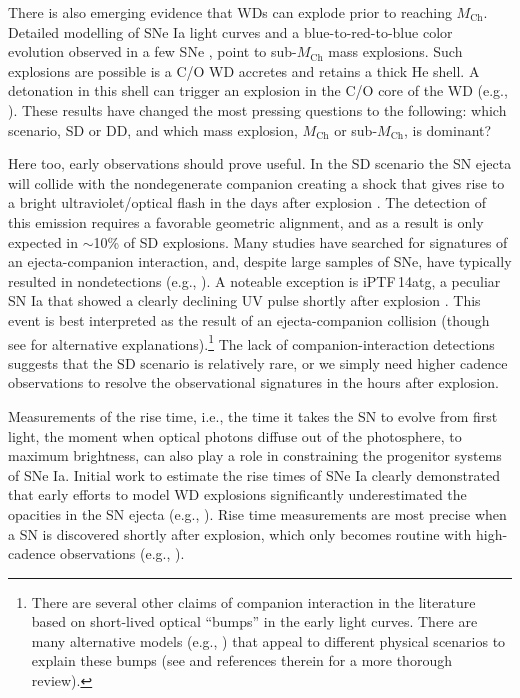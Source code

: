 \documentclass[twocolumn]{./aastex63}
\begin{document}
There is also emerging evidence that WDs can explode prior to reaching
$M_\mathrm{Ch}$. Detailed modelling of SNe Ia light curves \citep{Scalzo14a} and
a blue-to-red-to-blue color evolution observed in a few SNe
\citep{Jiang17,Polin19,De19}, point to sub-$M_\mathrm{Ch}$ mass explosions. Such
explosions are possible is a C/O WD accretes and retains a thick He shell. A
detonation in this shell can trigger an explosion in the C/O core of the WD
(e.g., \citealt{Nomoto82,Nomoto82a}). These results have changed the most
pressing questions to the following: which scenario, SD or DD, and which mass
explosion, $M_\mathrm{Ch}$ or sub-$M_\mathrm{Ch}$, is dominant?

Here too, early observations should prove useful. In the SD scenario the SN
ejecta will collide with the nondegenerate companion creating a shock that gives
rise to a bright ultraviolet/optical flash in the days after explosion
\citep{Kasen10a}. The detection of this emission requires a favorable geometric
alignment, and as a result is only expected in $\sim$10\% of SD explosions. Many
studies have searched for signatures of an ejecta-companion interaction, and,
despite large samples of SNe, have typically resulted in nondetections (e.g.,
\citealt{Hayden10,Ganeshalingam11,Bloom12a,Zheng13,Goobar15,Olling15,Shappee16a}). A noteable exception is iPTF\,14atg, a peculiar SN Ia that showed a clearly declining
UV pulse shortly after explosion \citep{Cao15}. This event is best interpreted
as the result of an ejecta-companion collision (though see
\citealt{Kromer16,Noebauer17} for alternative explanations).\footnote{There are
several other claims of companion interaction in the literature based on
short-lived optical ``bumps'' in the early light curves. There are many
alternative models (e.g., \citealt{Dessart14,Piro16}) that appeal to different
physical scenarios to explain these bumps (see \citealt{Shappee16a,Miller18} and
references therein for a more thorough review).} The lack of
companion-interaction detections suggests that the SD scenario is relatively
rare, or we simply need higher cadence observations to resolve the observational
signatures in the hours after explosion.

Measurements of the rise time, i.e., the time it takes the SN to evolve from
first light, the moment when optical photons diffuse out of the photosphere, to
maximum brightness, can also play a role in constraining the progenitor systems
of SNe Ia. Initial work to estimate the rise times of SNe Ia clearly demonstrated
that early efforts to model WD explosions significantly underestimated the
opacities in the SN ejecta (e.g., \citealt{Riess99a}). Rise time measurements
are most precise when a SN is discovered shortly after explosion, which only
becomes routine with high-cadence observations (e.g., \citealt{Miller18}).
\end{document}
